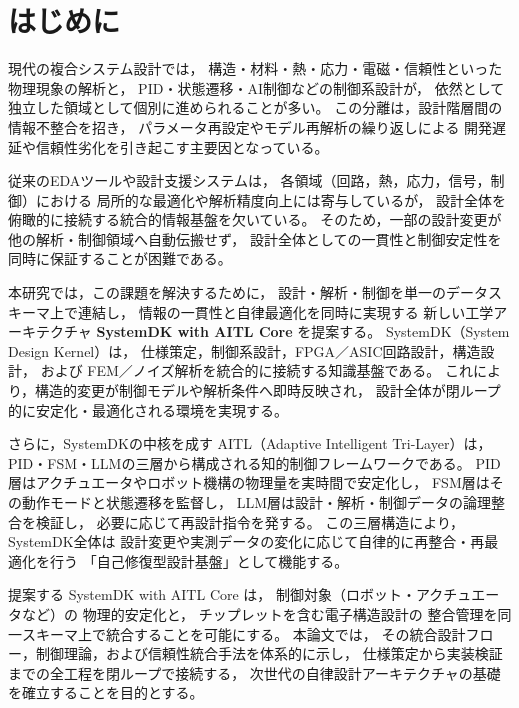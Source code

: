 \section{はじめに}

現代の複合システム設計では，
構造・材料・熱・応力・電磁・信頼性といった物理現象の解析と，
PID・状態遷移・AI制御などの制御系設計が，
依然として独立した領域として個別に進められることが多い。
この分離は，設計階層間の情報不整合を招き，
パラメータ再設定やモデル再解析の繰り返しによる
開発遅延や信頼性劣化を引き起こす主要因となっている。

従来のEDAツールや設計支援システムは，
各領域（回路，熱，応力，信号，制御）における
局所的な最適化や解析精度向上には寄与しているが，
設計全体を俯瞰的に接続する統合的情報基盤を欠いている。
そのため，一部の設計変更が他の解析・制御領域へ自動伝搬せず，
設計全体としての一貫性と制御安定性を同時に保証することが困難である。

本研究では，この課題を解決するために，
設計・解析・制御を単一のデータスキーマ上で連結し，
情報の一貫性と自律最適化を同時に実現する
新しい工学アーキテクチャ
\textbf{SystemDK with AITL Core} を提案する。
SystemDK（System Design Kernel）は，
仕様策定，制御系設計，FPGA／ASIC回路設計，構造設計，
および FEM／ノイズ解析を統合的に接続する知識基盤である。
これにより，構造的変更が制御モデルや解析条件へ即時反映され，
設計全体が閉ループ的に安定化・最適化される環境を実現する。

さらに，SystemDKの中核を成す
AITL（Adaptive Intelligent Tri-Layer）は，
PID・FSM・LLMの三層から構成される知的制御フレームワークである。
PID層はアクチュエータやロボット機構の物理量を実時間で安定化し，
FSM層はその動作モードと状態遷移を監督し，
LLM層は設計・解析・制御データの論理整合を検証し，
必要に応じて再設計指令を発する。
この三層構造により，SystemDK全体は
設計変更や実測データの変化に応じて自律的に再整合・再最適化を行う
「自己修復型設計基盤」として機能する。

提案する SystemDK with AITL Core は，
制御対象（ロボット・アクチュエータなど）の
物理的安定化と，
チップレットを含む電子構造設計の
整合管理を同一スキーマ上で統合することを可能にする。
本論文では，
その統合設計フロー，制御理論，および信頼性統合手法を体系的に示し，
仕様策定から実装検証までの全工程を閉ループで接続する，
次世代の自律設計アーキテクチャの基礎を確立することを目的とする。
